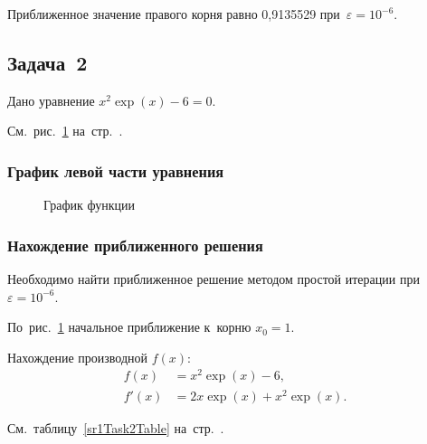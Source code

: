 \documentclass[10pt, a4paper, titlepage]{article}
\begin{document}
Приближенное значение правого корня равно 0,9135529 при~$\varepsilon=10^{-6}$.

\subsection{Задача~2}

Дано уравнение $x^2\exp(x)-6=0$.

См.~рис.~\ref{sr1Task2Function} на~стр.~\pageref{sr1Task2Function}.

\subsubsection*{График левой части уравнения}

\begin{figure}[htb]
    \centering
    \caption{График функции}
    \label{sr1Task2Function}
\end{figure}

\subsubsection*{Нахождение приближенного решения}

Необходимо найти приближенное решение методом простой итерации при~$\varepsilon=10^{-6}$.

По~рис.~\ref{sr1Task2Function} начальное приближение к~корню $x_0=1$.

Нахождение производной $f(x)$:
\begin{align*}
f(x) &= x^2\exp(x)-6, \\ 
f'(x) &= 2x\exp(x)+x^2\exp(x).
\end{align*}

См.~таблицу~\ref{sr1Task2Table} на~стр.~\pageref{sr1Task2Table}.
\end{document}
